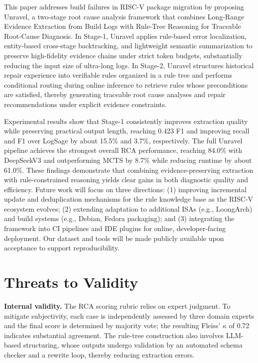 \documentclass[sigconf,anonymous]{acmart}
\begin{document}
This paper addresses build failures in RISC-V package migration by proposing Unravel, a two-stage root cause analysis framework that combines Long-Range Evidence Extraction from Build Logs with Rule-Tree Reasoning for Traceable Root-Cause Diagnosis. In Stage-1, Unravel applies rule-based error localization, entity-based cross-stage backtracking, and lightweight semantic summarization to preserve high-fidelity evidence chains under strict token budgets, substantially reducing the input size of ultra-long logs. In Stage-2, Unravel structures historical repair experience into verifiable rules organized in a rule tree and performs conditional routing during online inference to retrieve rules whose preconditions are satisfied, thereby generating traceable root cause analyses and repair recommendations under explicit evidence constraints.

Experimental results show that Stage-1 consistently improves extraction quality while preserving practical output length, reaching 0.423 F1 and improving recall and F1 over LogSage by about 15.5\% and 3.7\%, respectively. The full Unravel pipeline achieves the strongest overall RCA performance, reaching 84.0\% with DeepSeekV3 and outperforming MCTS by 8.7\% while reducing runtime by about 61.0\%. These findings demonstrate that combining evidence-preserving extraction with rule-constrained reasoning yields clear gains in both diagnostic quality and efficiency. Future work will focus on three directions: (1) improving incremental update and deduplication mechanisms for the rule knowledge base as the RISC-V ecosystem evolves; (2) extending adaptation to additional ISAs (e.g., LoongArch) and build systems (e.g., Debian, Fedora packaging); and (3) integrating the framework into CI pipelines and IDE plugins for online, developer-facing deployment. Our dataset and tools will be made publicly available upon acceptance to support reproducibility.

\section{Threats to Validity}

\textbf{Internal validity.} The RCA scoring rubric relies on expert judgment. To mitigate subjectivity, each case is independently assessed by three domain experts and the final score is determined by majority vote; the resulting Fleiss' $\kappa$ of 0.72 indicates substantial agreement. The rule-tree construction also involves LLM-based structuring, whose outputs undergo validation by an automated schema checker and a rewrite loop, thereby reducing extraction errors.
\end{document}
